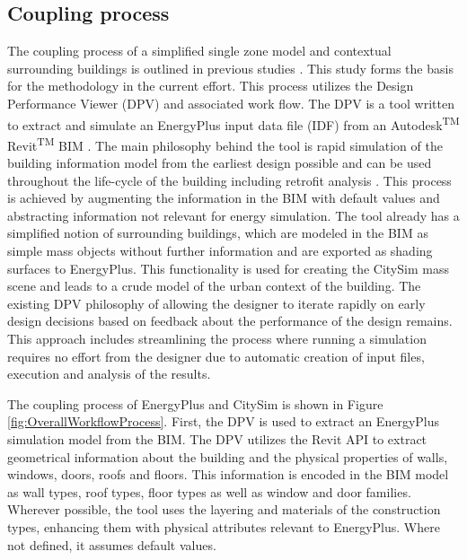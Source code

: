 \documentclass{tBPS2e}
\theoremstyle{plain}
\theoremstyle{definition}
\theoremstyle{remark}
\begin{document}
\subsection{Coupling process}
The coupling process of a simplified single zone model and contextual surrounding buildings is outlined in previous studies \citep{thomas2014multiscale,Thomas:2012wj}. This study forms the basis for the methodology in the current effort. This process utilizes the Design Performance Viewer (DPV) and associated work flow. The DPV is a tool written to extract and simulate an EnergyPlus input data file (IDF) from an Autodesk\textsuperscript{TM} Revit\textsuperscript{TM} BIM \citep{Schlueter2009}. The main philosophy behind the tool is rapid simulation of the building information model from the earliest design possible and can be used throughout the life-cycle of the building including retrofit analysis \citep{Miller:2014tu}. This process is achieved by augmenting the information in the BIM with default values and abstracting information not relevant for energy simulation. The tool already has a simplified notion of surrounding buildings, which are modeled in the BIM as simple mass objects without further information and are exported as shading surfaces to EnergyPlus. This functionality is used for creating the CitySim mass scene and leads to a crude model of the urban context of the building. The existing DPV philosophy of allowing the designer to iterate rapidly on early design decisions based on feedback about the performance of the design remains. This approach includes streamlining the process where running a simulation requires no effort from the designer due to automatic creation of input files, execution and analysis of the results.

The coupling process of EnergyPlus and CitySim is shown in Figure \ref{fig:OverallWorkflowProcess}. First, the DPV is used to extract an EnergyPlus simulation model from the BIM. The DPV utilizes the Revit API to extract geometrical information about the building and the physical properties of walls, windows, doors, roofs and floors. This information is encoded in the BIM model as wall types, roof types, floor types as well as window and door families. Wherever possible, the tool uses the layering and materials of the construction types, enhancing them with physical attributes relevant to EnergyPlus. Where not defined, it assumes default values. 
\end{document}
